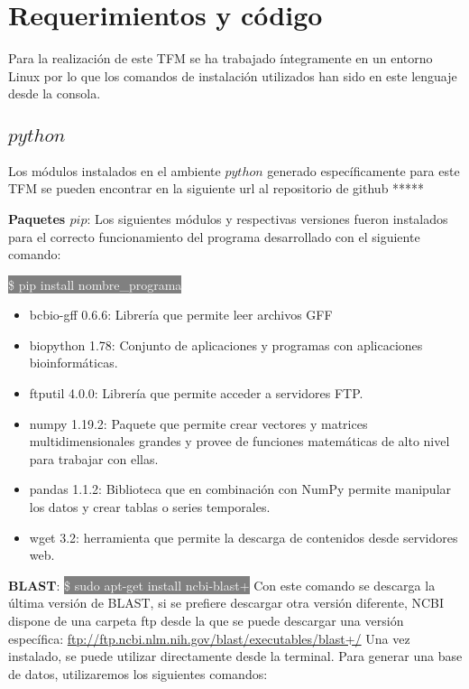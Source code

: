 \setcounter{page}{1} 
\pagestyle{plain}

\chapter{Requerimientos y código}\label{apA}

Para la realización de este TFM se ha trabajado íntegramente en un entorno Linux por lo que los comandos de instalación utilizados han sido en este lenguaje desde la consola.

\section{$python$}

Los módulos instalados en el ambiente $python$ generado específicamente para este TFM se pueden encontrar en la siguiente url al repositorio de github *****


\textbf{Paquetes $pip$}: Los siguientes módulos y respectivas versiones fueron instalados para el correcto funcionamiento del programa desarrollado con el siguiente comando: 

\vspace{3mm}
\colorbox{gray}{\textcolor{white} {\$ pip install nombre\_programa}}
\vspace{3mm}

\begin{itemize}
    \item bcbio-gff 0.6.6: Librería que permite leer archivos GFF
    \item biopython 1.78: Conjunto de aplicaciones y programas con aplicaciones bioinformáticas.
    \item ftputil 4.0.0: Librería que permite acceder a servidores FTP.
    \item numpy 1.19.2: Paquete que permite crear vectores y matrices multidimensionales grandes y provee de funciones matemáticas de alto nivel para trabajar con ellas.
    \item pandas 1.1.2: Biblioteca que en combinación con NumPy permite manipular los datos y crear tablas o series temporales.
    \item wget 3.2: herramienta que permite la descarga de contenidos desde servidores web.
\end{itemize}

\textbf{BLAST}: \colorbox{gray}{\textcolor{white} {\$ sudo apt-get install ncbi-blast+}}
Con este comando se descarga la última versión de BLAST, si se prefiere descargar otra versión diferente, NCBI dispone de una carpeta ftp desde la que se puede descargar una versión específica: \url{ftp://ftp.ncbi.nlm.nih.gov/blast/executables/blast+/}
Una vez instalado, se puede utilizar directamente desde la terminal. Para generar una base de datos, utilizaremos los siguientes comandos:

